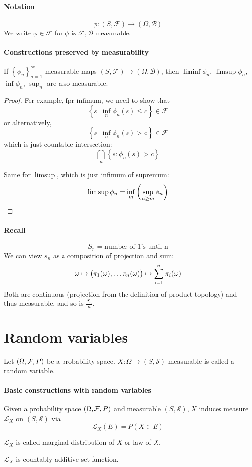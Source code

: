 \paragraph{Notation} 
$$\phi: (S,\mathcal{F}) \to (\Omega, \mathcal{B})$$
We write $\phi\in \mathcal{F}$ for $\phi$ is $\mathcal{F},\mathcal{B}$ measurable.
\paragraph{Constructions preserved by measurability}
\begin{prop}
	If $\left\{ \phi_n \right\}_{n=1}^\infty$ measurable maps $(S,\mathcal{F}) \to (\Omega, \mathcal{B})$, then $\liminf \phi_n$, $\limsup \phi_n$, $\inf \phi_n$, $\sup_n$ are also measurable.
	\begin{proof}
		For example, fpr infimum, we need to show that
		$$\left\{s|\: \inf\limits_n \phi_n(s) \leq c  \right\} \in \mathcal{F}$$
		or alternatively,
		$$\left\{s|\: \inf\limits_n \phi_n(s) > c  \right\} \in \mathcal{F}$$
		which is just countable intersection:
		$$\bigcap_n \left\{ s: \phi_n(s) > c \right\}$$
		
		Same for $\limsup$, which is just infimum of supremum:
		$$\limsup \phi_n = \inf\limits_m \qty(\sup\limits_{n\geq m} \phi_n)$$
	\end{proof}
\end{prop}

\paragraph{Recall}
$$S_n = \text{number of 1's until n}$$
We can view $s_n$ as a composition of projection and sum:
$$\omega \mapsto \qty\big(\pi_1(\omega),\dots \pi_n(\omega)) \mapsto \sum_{i=1}^n \pi_i(\omega)$$
Both are continuous (projection from the definition of product topology) and thus measurable, and so is $\frac{S_n}{n}$.
\section{Random variables}
\begin{definition}
	Let $\qty(\Omega, \mathcal{F}, P)$ be a probability space. 
	$X: \Omega \to (S, \mathcal{S}) $ measurable is called a random variable. 
\end{definition}

\paragraph{Basic constructions with random variables}
\begin{definition}
	Given a probability space $\qty(\Omega, \mathcal{F}, P)$  and measurable $ (S, \mathcal{S})$, $X$ induces measure $\mathcal{L}_X$ on $ (S, \mathcal{S})$ via
	$$\mathcal{L}_X(E) = P(X \in E)$$

$\mathcal{L}_X$ is called marginal distribution of $X$ or law of $X$.
\end{definition}
\begin{prop}
	$\mathcal{L}_X$ is countably additive set function.
\end{prop}

